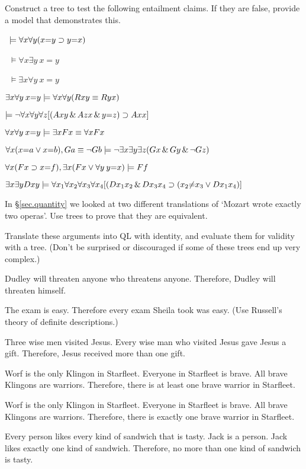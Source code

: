 \solutions
\problempart Construct a tree to test the following entailment claims. If they are false, provide a model that demonstrates this.
\label{pr.IdentityTrees}
\begin{earg}
\item\  $\models \forall x \forall y (x{=}y \supset y{=}x)$
\item\ $\models \forall x \exists y \: x{=}y$
\item\  $\models \exists x \forall y \: x{=}y$
\item   $\exists x \forall y \: x{=}y \models \forall x \forall y (Rxy \equiv Ryx)$
\item   $\models \neg \forall x \forall y \forall z [(Axy \,\&\, Azx \,\&\, y{=}z) \supset Axx] $
\item  $\forall x \forall y \: x{=}y \models \exists x Fx \equiv \forall x Fx$
\item $\forall x (x{=}a \vee x{=}b), Ga \equiv \neg Gb \models \neg \exists x \exists y \exists z (Gx \,\&\, Gy \,\&\, \neg Gz)$
\item $\forall x (Fx \supset x{=}f), \exists x (Fx \vee \forall y \: y{=}x) \models Ff$
\item $\exists x \exists y Dxy \models \forall x_{1} \forall x_{2} \forall x_{3} \forall x_{4} [(Dx_{1}x_{2} \,\&\, Dx_{3}x_{4} \supset (x_{2}{\neq}x_{3} \vee Dx_{1}x_{4})]$
\end{earg}

\problempart In \S \ref{sec.quantity} we looked at two different translations of `Mozart wrote exactly two operas'. Use trees to prove that they are equivalent.

\problempart Translate these arguments into QL with identity, and evaluate them for validity with a tree. (Don't be surprised or discouraged if some of these trees end up very complex.)
\label{pr.IdentityArguments}
\begin{earg}
\item Dudley will threaten anyone who threatens anyone. Therefore, Dudley will threaten himself.
\item The exam is easy. Therefore every exam Sheila took was easy. (Use Russell's theory of definite descriptions.)
\item Three wise men visited Jesus. Every wise man who visited Jesus gave Jesus a gift. Therefore, Jesus received more than one gift.
\item Worf is the only Klingon in Starfleet. Everyone in Starfleet is brave. All brave Klingons are warriors. Therefore, there is at least one brave warrior in Starfleet.
\item Worf is the only Klingon in Starfleet. Everyone in Starfleet is brave. All brave Klingons are warriors. Therefore, there is exactly one brave warrior in Starfleet.
\item Every person likes every kind of sandwich that is tasty. Jack is a person. Jack likes exactly one kind of sandwich. Therefore, no more than one kind of sandwich is tasty.
\end{earg}